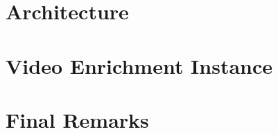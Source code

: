 \documentclass[sigconf]{acmart}
\begin{document}
\section{Architecture}	
	


\pagebreak

\section{Video Enrichment Instance}
	
	
%	
	
	
\section{Final Remarks}
	

\begin{acks}
	
\end{acks}


 
\end{document}
